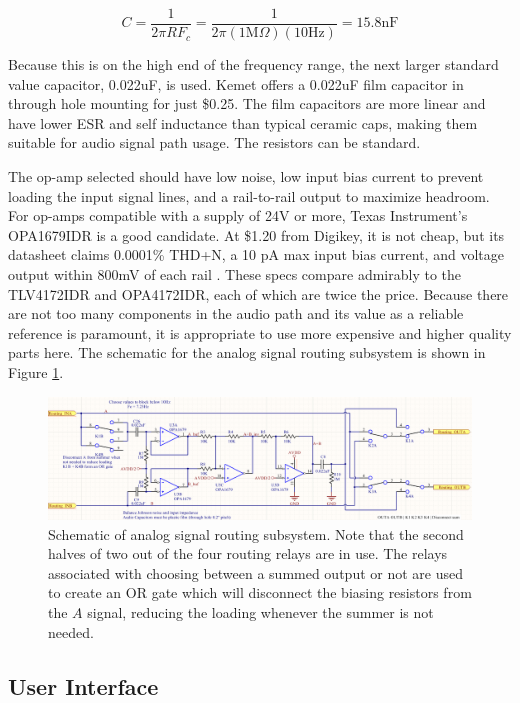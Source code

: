 \documentclass{article}
\begin{document}
	$$ C = \frac{1}{2\pi R F_c} = \frac{1}{2\pi (1 \text{M}\Omega) (10 \text{Hz})} = 15.8 \text{nF}$$

	Because this is on the high end of the frequency range, the next larger standard value capacitor, 0.022uF, is used.  Kemet offers a 0.022uF film capacitor in through hole mounting for just \$0.25.  The film capacitors are more linear and have lower ESR and self inductance than typical ceramic caps, making them suitable for audio signal path usage.  The resistors can be standard.

	The op-amp selected should have low noise, low input bias current to prevent loading the input signal lines, and a rail-to-rail output to maximize headroom.  For op-amps compatible with a supply of 24V or more, Texas Instrument's OPA1679IDR is a good candidate.  At \$1.20 from Digikey, it is not cheap, but its datasheet claims 0.0001\% THD+N, a 10 pA max input bias current, and voltage output within 800mV of each rail \cite{OPA1679IDRdatasheet}.  These specs compare admirably to the TLV4172IDR and OPA4172IDR, each of which are twice the price.  Because there are not too many components in the audio path and its value as a reliable reference is paramount, it is appropriate to use more expensive and higher quality parts here.  The schematic for the analog signal routing subsystem is shown in Figure \ref{fig:routingschem}.  

	\begin{figure}
		\centering
		\includegraphics[width = \textwidth]{PR4Images/RoutingSchem.PNG}
		\caption{Schematic of analog signal routing subsystem.  Note that the second halves of two out of the four routing relays are in use.  The relays associated with choosing between a summed output or not are used to create an OR gate which will disconnect the biasing resistors from the $A$ signal, reducing the loading whenever the summer is not needed.}
		\label{fig:routingschem}
	\end{figure}

	\subsection{User Interface}
\end{document}
